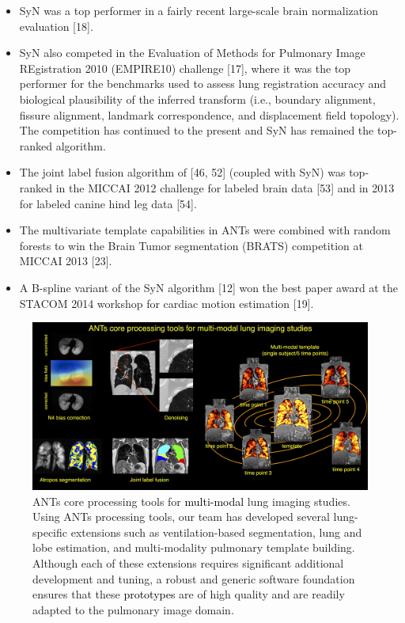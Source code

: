 \documentclass[11pt,]{article}
\providecommand{\tightlist}{%
  \setlength{\itemsep}{0pt}\setlength{\parskip}{0pt}}
\begin{document}
\begin{itemize}
\tightlist
\item
  SyN was a top performer in a fairly recent large-scale brain
  normalization evaluation {[}18{]}.
\item
  SyN also competed in the Evaluation of Methods for Pulmonary Image
  REgistration 2010 (EMPIRE10) challenge {[}17{]}, where it was the top
  performer for the benchmarks used to assess lung registration accuracy
  and biological plausibility of the inferred transform (i.e., boundary
  alignment, fissure alignment, landmark correspondence, and
  displacement field topology). The competition has continued to the
  present and SyN has remained the top-ranked algorithm.
\item
  The joint label fusion algorithm of {[}46, 52{]} (coupled with SyN)
  was top-ranked in the MICCAI 2012 challenge for labeled brain data
  {[}53{]} and in 2013 for labeled canine hind leg data {[}54{]}.
\item
  The multivariate template capabilities in ANTs were combined with
  random forests to win the Brain Tumor segmentation (BRATS) competition
  at MICCAI 2013 {[}23{]}.
\item
  A B-spline variant of the SyN algorithm {[}12{]} won the best paper
  award at the STACOM 2014 workshop for cardiac motion estimation
  {[}19{]}.
\end{itemize}

\begin{figure}[htbp]
\centering
\includegraphics{Figs/coreANtsToolsLung.png}
\caption{ANTs core processing tools for \textcolor{black}{multi-modal}
lung imaging studies. Using ANTs processing tools, our team has
developed several lung-specific extensions such as ventilation-based
segmentation, lung and lobe estimation, and multi-modality pulmonary
template building. Although each of these extensions requires
significant additional development and tuning, a robust and generic
software foundation ensures that these \textcolor{black}{prototypes} are
of high quality and are readily adapted to the pulmonary image domain.}
\end{figure}
\end{document}
